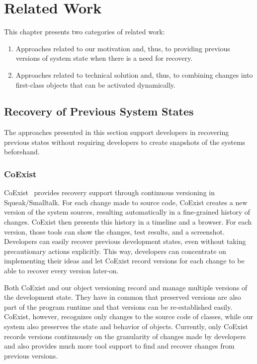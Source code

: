 \chapter{Related Work} \label{chapter:RELATED_WORK}

This chapter presents two categories of related work:

\begin{enumerate}
    \item Approaches related to our motivation and, thus, to providing previous versions of system state when there is a need for recovery.
    \item Approaches related to technical solution and, thus, to combining changes into first-class objects that can be activated dynamically.
\end{enumerate}


\section{Recovery of Previous System States}

The approaches presented in this section support developers in recovering previous states without requiring developers to create snapshots of the systems beforehand.


\subsection{CoExist}

CoExist~\cite{Steinert2012COE} provides recovery support through continuous versioning in Squeak/Smalltalk.
For each change made to source code, CoExist creates a new version of the system sources, resulting automatically in a fine-grained history of changes.
CoExist then presents this history in a timeline and a browser.
For each version, those tools can show the changes, test results, and a screenshot.
Developers can easily recover previous development states, even without taking precautionary actions explicitly.
This way, developers can concentrate on implementing their ideas and let CoExist record versions for each change to be able to recover every version later-on.

Both CoExist and our object versioning record and manage multiple versions of the development state.
They have in common that preserved versions are also part of the program runtime and that versions can be re-established easily.
CoExist, however, recognizes only changes to the source code of classes, while our system also preserves the state and behavior of objects.
Currently, only CoExist records versions continuously on the granularity of changes made by developers and also provides much more tool support to find and recover changes from previous versions.


